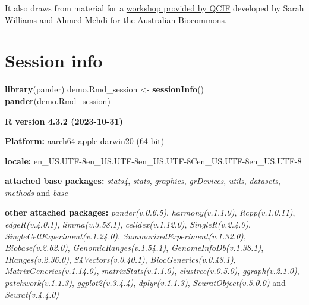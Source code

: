 \documentclass[
]{book}
\newenvironment{Shaded}{\begin{snugshade}}{\end{snugshade}}
\newcommand{\FunctionTok}[1]{\textcolor[rgb]{0.13,0.29,0.53}{\textbf{#1}}}
\newcommand{\NormalTok}[1]{#1}
\newcommand{\OtherTok}[1]{\textcolor[rgb]{0.56,0.35,0.01}{#1}}
\begin{document}
It also draws from material for a \href{https://swbioinf.github.io/scRNAseqInR_Doco/index.html}{workshop provided by QCIF} developed by Sarah Williams and Ahmed Mehdi for the Australian Biocommons.

\hypertarget{session-info}{%
\chapter{Session info}\label{session-info}}

\begin{Shaded}
\begin{Highlighting}[]

\FunctionTok{library}\NormalTok{(pander)}
\NormalTok{demo.Rmd\_session }\OtherTok{\textless{}{-}} \FunctionTok{sessionInfo}\NormalTok{()}
\FunctionTok{pander}\NormalTok{(demo.Rmd\_session)}
\end{Highlighting}
\end{Shaded}

\textbf{R version 4.3.2 (2023-10-31)}

\textbf{Platform:} aarch64-apple-darwin20 (64-bit)

\textbf{locale:}
en\_US.UTF-8\textbar\textbar en\_US.UTF-8\textbar\textbar en\_US.UTF-8\textbar\textbar C\textbar\textbar en\_US.UTF-8\textbar\textbar en\_US.UTF-8

\textbf{attached base packages:}
\emph{stats4}, \emph{stats}, \emph{graphics}, \emph{grDevices}, \emph{utils}, \emph{datasets}, \emph{methods} and \emph{base}

\textbf{other attached packages:}
\emph{pander(v.0.6.5)}, \emph{harmony(v.1.1.0)}, \emph{Rcpp(v.1.0.11)}, \emph{edgeR(v.4.0.1)}, \emph{limma(v.3.58.1)}, \emph{celldex(v.1.12.0)}, \emph{SingleR(v.2.4.0)}, \emph{SingleCellExperiment(v.1.24.0)}, \emph{SummarizedExperiment(v.1.32.0)}, \emph{Biobase(v.2.62.0)}, \emph{GenomicRanges(v.1.54.1)}, \emph{GenomeInfoDb(v.1.38.1)}, \emph{IRanges(v.2.36.0)}, \emph{S4Vectors(v.0.40.1)}, \emph{BiocGenerics(v.0.48.1)}, \emph{MatrixGenerics(v.1.14.0)}, \emph{matrixStats(v.1.1.0)}, \emph{clustree(v.0.5.0)}, \emph{ggraph(v.2.1.0)}, \emph{patchwork(v.1.1.3)}, \emph{ggplot2(v.3.4.4)}, \emph{dplyr(v.1.1.3)}, \emph{SeuratObject(v.5.0.0)} and \emph{Seurat(v.4.4.0)}
\end{document}
